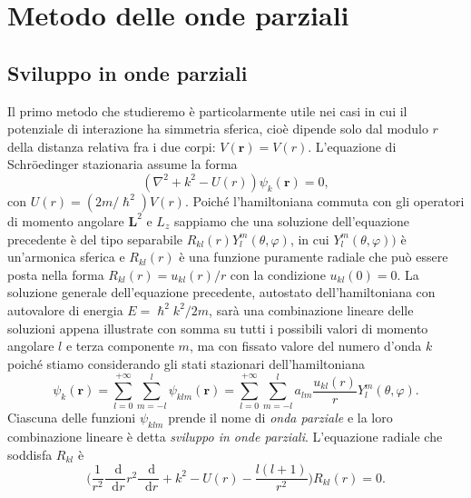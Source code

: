 \documentclass[a4paper,fleqn,twoside,12pt]{article}
\renewcommand{\phi}{\varphi}
\newcommand*{\dd}{\mathop{}\!\mathrm{d}} %
\newcommand*{\toder}[3][]{\frac{{\dd^{#1}}#2}{\dd {#3}^{#1}}}
\begin{document}

\section{Metodo delle onde parziali}
\label{sec:onde-parziali}

\subsection{Sviluppo in onde parziali}
\label{sec:sviluppo-onde}

Il primo metodo che studieremo è particolarmente utile nei casi in cui il
potenziale di interazione ha simmetria sferica, cioè dipende solo dal modulo $r$
della distanza relativa fra i due corpi: $V(\bm{r}) = V(r)$.  L'equazione di
Schröedinger stazionaria assume la forma
\begin{equation}
  (\nabla^{2} + k^{2} - U(r)) \psi_{k}(\bm{r}) = 0,
\end{equation}
con $U(r) = (2m/\hslash^{2})V(r)$.  Poiché l'hamiltoniana commuta con gli
operatori di momento angolare $\bm{L}^{2}$ e $L_{z}$ sappiamo che una soluzione
dell'equazione precedente è del tipo separabile
$R_{kl}(r)Y_{l}^{m}(\theta,\phi)$, in cui $Y_{l}^{m}(\theta,\phi))$ è
un'armonica sferica e $R_{kl}(r)$ è una funzione puramente radiale che può
essere posta nella forma $R_{kl}(r) = u_{kl}(r)/r$ con la condizione
$u_{kl}(0) = 0$.  La soluzione generale dell'equazione precedente, autostato
dell'hamiltoniana con autovalore di energia $E = \hslash^{2}k^{2}/2m$, sarà una
combinazione lineare delle soluzioni appena illustrate con somma su tutti i
possibili valori di momento angolare $l$ e terza componente $m$, ma con fissato
valore del numero d'onda $k$ poiché stiamo considerando gli stati stazionari
dell'hamiltoniana
\begin{equation}
  \label{eq:onde-parziali1}
  \psi_{k}(\bm{r}) = \sum_{l = 0}^{+\infty} \sum_{m = -l}^{l} \psi_{klm}(\bm{r})
  = \sum_{l = 0}^{+\infty} \sum_{m = -l}^{l} a_{lm}
  \frac{u_{kl}(r)}{r}Y_{l}^{m}(\theta,\phi).
\end{equation}
Ciascuna delle funzioni $\psi_{klm}$ prende il nome di \emph{onda parziale} e la
loro combinazione lineare è detta \emph{sviluppo in onde parziali}.  L'equazione
radiale che soddisfa $R_{kl}$ è
\begin{equation}
  \label{eq:diff-R-op}
  \bigg(\frac{1}{r^{2}}\toder{}{r}r^{2}\toder{}{r} + k^{2} - U(r) -
  \frac{l(l+1)}{r^{2}}\bigg)R_{kl}(r) = 0.
\end{equation}
\end{document}
